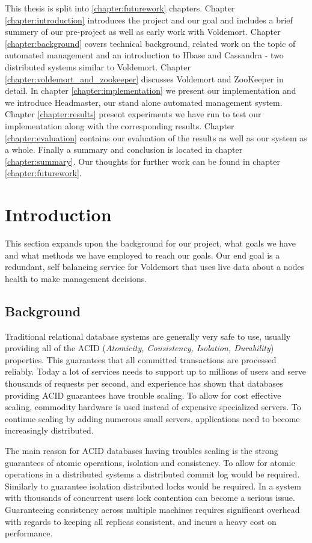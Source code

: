 
This thesis is split into \ref{chapter:futurework} chapters. Chapter \ref{chapter:introduction} introduces the project and our goal and includes a brief summery of our pre-project as well as early work with Voldemort. Chapter \ref{chapter:background} covers technical background, related work on the topic of automated management and an introduction to Hbase and Cassandra - two distributed systems similar to Voldemort. Chapter \ref{chapter:voldemort_and_zookeeper} discusses Voldemort and ZooKeeper in detail. In chapter \ref{chapter:implementation} we present our implementation and we introduce Headmaster, our stand alone automated management system. Chapter \ref{chapter:results} present experiments we have run to test our implementation along with the corresponding results. Chapter \ref{chapter:evaluation} contains our evaluation of the results as well as our system as a whole. Finally a summary and conclusion is located in chapter \ref{chapter:summary}. Our thoughts for further work can be found in chapter \ref{chapter:futurework}. 

\section{Introduction}
This section expands upon the background for our project, what goals we have and what methods we have employed to reach our goals. 
Our end goal is a redundant, self balancing service for Voldemort that uses live data about a nodes health to make management decisions.

\subsection{Background}
Traditional relational database systems are generally very safe to use, usually providing all of the ACID (\emph{Atomicity, Consistency, Isolation, Durability}) properties.
This guarantees that all committed transactions are processed reliably. 
Today a lot of services needs to support up to millions of users and serve thousands of requests per second, and experience has shown that databases providing ACID guarantees have trouble scaling. 
To allow for cost effective scaling, commodity hardware is used instead of expensive specialized servers. To continue scaling by adding numerous small servers, applications need to become increasingly distributed.

The main reason for ACID databases having troubles scaling is the strong guarantees of atomic operations, isolation and consistency. 
To allow for atomic operations in a distributed systems a distributed commit log would be required. 
Similarly to guarantee isolation distributed locks would be required. In a system with thousands of concurrent users lock contention can become a serious issue. 
Guaranteeing consistency across multiple machines requires significant overhead with regards to keeping all replicas consistent, and incurs a heavy cost on performance. 

